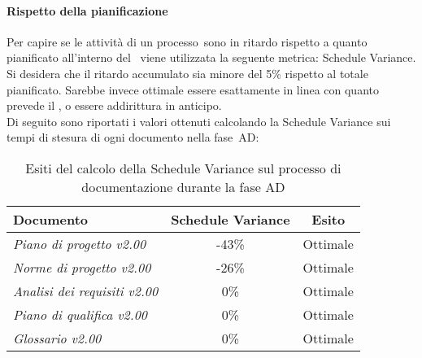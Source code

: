 \documentclass[../PianoDiQualifica.tex]{subfiles}
\begin{document}
\begin{appendices}
			\paragraph{Rispetto della pianificazione}
			Per capire se le attività di un processo\g\ sono in ritardo rispetto a quanto pianificato all’interno del \pianodiprogetto\ viene utilizzata la seguente metrica: Schedule Variance.\\
			Si desidera che il ritardo accumulato sia minore del 5\% rispetto al totale pianificato. Sarebbe invece ottimale essere esattamente in linea con quanto prevede il \pianodiprogetto, o essere addirittura in anticipo.\\
			Di seguito sono riportati i valori ottenuti calcolando la Schedule Variance sui tempi di stesura di ogni documento nella fase\g\ AD:
			\begin{table}[H]
				\centering
				\begin{tabular}{l * {2}{c}}
					\toprule
					\textbf{Documento} & \textbf{Schedule Variance} & \textbf{Esito} \\
					\midrule
					\textit{Piano di progetto v2.00} & -43\% &  Ottimale \\
					\textit{Norme di progetto v2.00} & -26\% & Ottimale \\
					\textit{Analisi dei requisiti v2.00} & 0\% & Ottimale \\
					\textit{Piano di qualifica v2.00} & 0\% & Ottimale \\
					\textit{Glossario v2.00} & 0\% & Ottimale \\
					\bottomrule
				\end{tabular}
				\caption{Esiti del calcolo della Schedule Variance sul processo di documentazione durante la fase AD}
				\label{tab:esiti_schedule_variance}
			\end{table}
			

\end{appendices}
\end{document}
